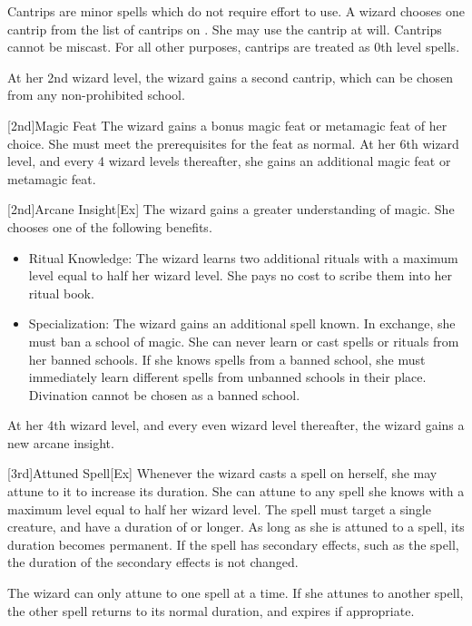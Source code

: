 Cantrips are minor spells which do not require effort to use.
A wizard chooses one cantrip from the list of cantrips on .
She may use the cantrip at will.
Cantrips cannot be miscast.
For all other purposes, cantrips are treated as 0th level spells.

At her 2nd wizard level, the wizard gains a second cantrip, which can be chosen from any non-prohibited school.

[2nd]{Magic Feat}
The wizard gains a bonus magic feat or metamagic feat of her choice.
She must meet the prerequisites for the feat as normal.
At her 6th wizard level, and every 4 wizard levels thereafter, she gains an additional magic feat or metamagic feat.

[2nd]{Arcane Insight}[Ex]\label{Arcane Insight}
The wizard gains a greater understanding of magic.
She chooses one of the following benefits.
\begin{itemize}
    \item Ritual Knowledge: The wizard learns two additional rituals with a maximum level equal to half her wizard level.
        She pays no cost to scribe them into her ritual book.
    \item Specialization: The wizard gains an additional spell known.
        In exchange, she must ban a school of magic.
        She can never learn or cast spells or rituals from her banned schools.
        If she knows spells from a banned school, she must immediately learn different spells from unbanned schools in their place.
        Divination cannot be chosen as a banned school.
\end{itemize}

At her 4th wizard level, and every even wizard level thereafter, the wizard gains a new arcane insight.

[3rd]{Attuned Spell}[Ex]
Whenever the wizard casts a spell on herself, she may attune to it to increase its duration.
She can attune to any spell she knows with a maximum level equal to half her wizard level.
The spell must target a single creature, and have a duration of \durshort or longer.
As long as she is attuned to a spell, its duration becomes permanent.
If the spell has secondary effects, such as the  spell, the duration of the secondary effects is not changed.

The wizard can only attune to one spell at a time.
If she attunes to another spell, the other spell returns to its normal duration, and expires if appropriate.

